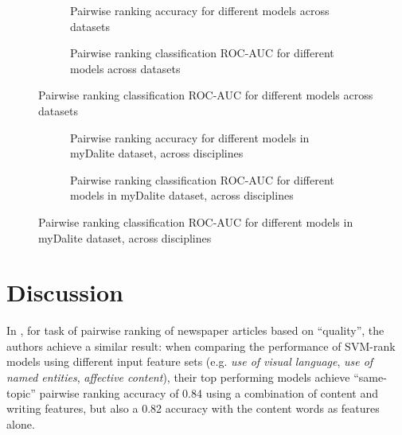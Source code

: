 \documentclass[runningheads]{llncs}
\begin{document}
\begin{figure}
	\begin{subfigure}[t]{0.5\linewidth}
		\centering
		\scalebox{0.5}{}

		\caption{Pairwise ranking accuracy for different models across datasets}
	\end{subfigure}%
	\qquad
	\begin{subfigure}[t]{0.5\linewidth}
		\centering
		\scalebox{0.5}{}

		\caption{Pairwise ranking classification ROC-AUC for different models 
		across datasets}
	\end{subfigure}
\end{figure}


\begin{figure}
	\begin{subfigure}[t]{0.5\linewidth}
		\centering
		\scalebox{0.5}{}
		
		\caption{Pairwise ranking accuracy for different models in myDalite 
		dataset, across disciplines}
	\end{subfigure}%
	\qquad
	\begin{subfigure}[t]{0.5\linewidth}
		\centering
		\scalebox{0.5}{}
		
		\caption{Pairwise ranking classification ROC-AUC for different models 
		in myDalite dataset, across disciplines}
	\end{subfigure}
\end{figure}


\section{Discussion}

In \cite{louis_what_2013}, for task of pairwise ranking of newspaper articles 
based on ``quality'', the authors achieve a similar result: when comparing the 
performance of SVM-rank models using different input feature sets (e.g. 
\textit{use of visual language}, \textit{use of named entities}, 
\textit{affective content}), their top performing models achieve ``same-topic'' 
pairwise ranking accuracy of 0.84 using a combination of content and writing 
features, but also a 0.82 accuracy with the content words as features alone.
\end{document}
